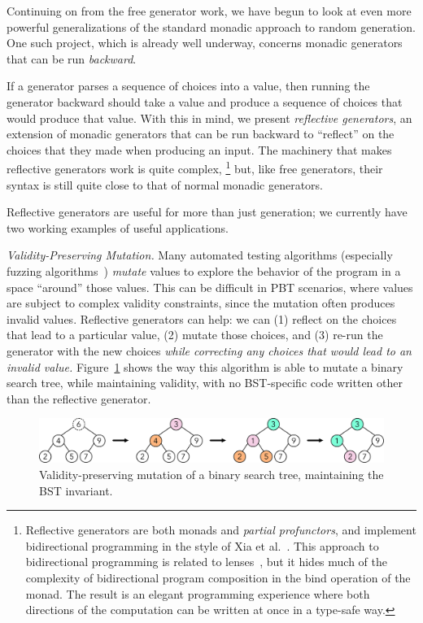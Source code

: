 Continuing on from the free generator work, we have begun to look at even more
powerful generalizations of the standard monadic approach to random generation.
One such project, which is already well underway, concerns monadic generators
that can be run {\em backward}.

If a generator parses a sequence of choices into a value, then running the
generator backward should take a value and produce a sequence of choices that
would produce that value. With this in mind, we present {\em reflective
generators}, an extension of monadic generators that can be run backward to
``reflect'' on the choices that they made when producing an input. The machinery
that makes reflective generators work is quite complex,%
\footnote{Reflective generators are both monads and {\em partial profunctors},
and implement bidirectional programming in the style of Xia et
al.~\cite{xia2019composing}. This approach to bidirectional programming is
related to lenses~\cite{foster2009bidirectional}, but it hides much of the
complexity of bidirectional program composition in the bind operation of the
monad. The result is an elegant programming experience where both directions of
the computation can be written at once in a type-safe way.}
but, like free generators, their syntax is still quite close to that of normal
monadic generators.

Reflective generators are useful for more than just generation; we currently
have two working examples of useful applications.

{\em Validity-Preserving Mutation.} Many automated testing algorithms
(especially fuzzing algorithms~\cite{afl-readme}) {\em mutate} values to explore
the behavior of the program in a space ``around'' those values. This can be
difficult in PBT scenarios, where values are subject to complex validity
constraints, since the mutation often produces invalid values. Reflective
generators can help: we can (1) reflect on the choices that lead to a particular
value, (2) mutate those choices, and (3) re-run the generator with the new
choices {\em while correcting any choices that
would lead to an invalid value.} Figure~\ref{fig:mutation} shows the way this
algorithm is able to mutate a binary search tree, while maintaining validity,
with no BST-specific code written other than the reflective generator.

\begin{figure}[h]
  \centering
  \includegraphics[width=.6\textwidth]{assets/mutate-diagram.pdf}
  \caption{Validity-preserving mutation of a binary search tree, maintaining the
  BST invariant.}\label{fig:mutation}
\end{figure}

